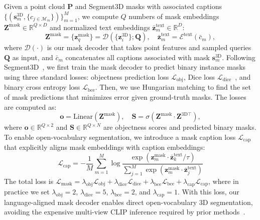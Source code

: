 Given a point cloud $\mathbf{P}$ and Segment3D masks with associated captions $\{(\mathbf{s}^{\mathrm{3D}}_m, \{c_{j \in \mathcal{M}_m}\})\}_{m=1}^M$, we compute $Q$ numbers of mask embeddings $\mathbf{Z}^{\mathrm{mask}} \in \mathbb{R}^{Q \times D}$ and normalized text embeddings $\bar{\mathbf{z}}^{\text{text}}_m \in \mathbb{R}^D$:
\begin{equation}
    \label{eq:mask_decoder}
    \mathbf{Z}^{\mathrm{mask}} = \{\mathbf{z}^{\text{mask}}_q\} = \mathcal{D}(\{\mathbf{z}^{\text{3D}}_i\}; \mathbf{Q}), \quad \mathbf{\bar{z}}^{\text{text}}_m = \mathcal{E}^{\text{text}}(\bar{c}_m),
\end{equation}
where $\mathcal{D}(\cdot)$ is our mask decoder that takes point features and sampled queries $\mathbf{Q}$ as input, and $\bar{c}_m$ concatenates all captions associated with mask $\mathbf{s}^{\mathrm{3D}}_m$.
Following Segment3D~\cite{huang2024segment3d}, we first train the mask decoder to predict binary instance masks using three standard losses: objectness prediction loss $\mathcal{L}_{\mathrm{obj}}$, Dice loss $\mathcal{L}_{\mathrm{dice}}$~\cite{dice_loss}, and binary cross entropy loss $\mathcal{L}_{\mathrm{bce}}$. Then, we use Hungarian matching to find the set of mask predictions that minimizes error given ground-truth masks.
The losses are computed as:
\begin{equation}
    \label{eq:mask_prediction}
    \mathbf{o} = \mathrm{Linear}(\mathbf{Z}^{\mathrm{mask}}), \quad \mathbf{S} = \sigma(\mathbf{Z}
    ^{\mathrm{mask}} \cdot \mathbf{Z}^{\text{3D}\top}),
\end{equation}
where $\mathbf{o} \in \mathbb{R}^{Q \times 2}$ and $\mathbf{S} \in \mathbb{R}^{Q \times N}$ are objectness scores and predicted binary masks.
To enable open-vocabulary segmentation, we introduce a mask caption loss $\mathcal{L}_{\mathrm{cap}}$ that explicitly aligns mask embeddings with caption embeddings:
\begin{equation}
    \label{eq:mask_caption_loss}
    \mathcal{L}_{\mathrm{cap}} = -\frac{1}{M}\sum_{m=1}^{M}\log\frac{\exp(\mathbf{z}^{\text{mask}}_m\cdot\bar{\mathbf{z}}^{\text{text}}_k/\tau)}{\sum_{j=1}^{M}\exp(\mathbf{z}^{\text{mask}}_m\cdot\bar{\mathbf{z}}^{\text{text}}_j)}
\end{equation}
The total loss is $\mathcal{L}_{\mathrm{mask}} = \lambda_{\mathrm{obj}}\mathcal{L}_{\mathrm{obj}} + \lambda_{\mathrm{dice}}\mathcal{L}_{\mathrm{dice}} + \lambda_{\mathrm{bce}}\mathcal{L}_{\mathrm{bce}} + \lambda_{\mathrm{cap}}\mathcal{L}_{\mathrm{cap}}$, where in practice we set $\lambda_{\mathrm{obj}}=2$, $\lambda_{\mathrm{dice}}=5$, $\lambda_{\mathrm{bce}}=2$, and $\lambda_{\mathrm{cap}}=1$.
With this loss, our language-aligned mask decoder enables direct open-vocabulary 3D segmentation, avoiding the expensive multi-view CLIP inference required by prior methods~\cite{takmaz2023openmask3d,nguyen2024open3dis,huang2024openins3d}.
